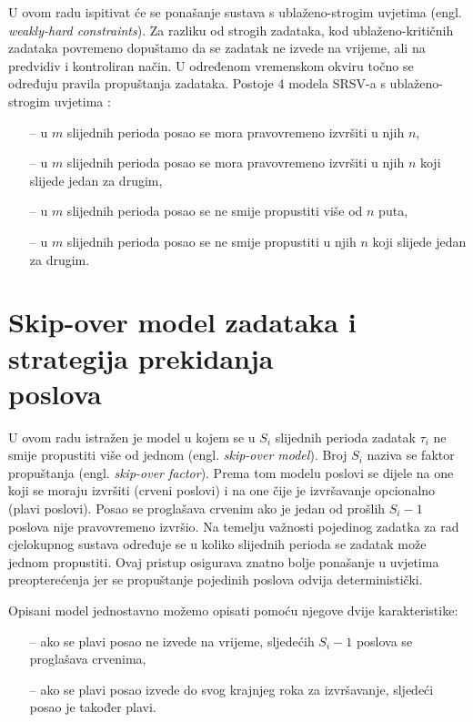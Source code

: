 \documentclass[../zavrsni.tex]{subfiles}
\begin{document}

U ovom radu ispitivat će se ponašanje sustava s ublaženo-strogim uvjetima (engl. \textit{weakly-hard constraints}). Za razliku od 
strogih zadataka, kod ublaženo-kritičnih zadataka povremeno dopuštamo da se zadatak ne izvede na vrijeme, ali na predvidiv i 
kontroliran način. U određenom vremenskom okviru točno se određuju pravila propuštanja zadataka. Postoje 4 modela SRSV-a s ublaženo-strogim uvjetima :
\begin{itemize}
    \item[--] u $m$ slijednih perioda posao se mora pravovremeno izvršiti u njih $n$,
    \item[--] u $m$ slijednih perioda posao se mora pravovremeno izvršiti u njih $n$ koji slijede jedan za drugim,
    \item[--] u $m$ slijednih perioda posao se ne smije propustiti više od $n$ puta,
    \item[--] u $m$ slijednih perioda posao se ne smije propustiti u njih $n$ koji slijede jedan za drugim.
\end{itemize}

\section{Skip-over model zadataka i strategija prekidanja \\poslova}

U ovom radu istražen je model u kojem se u $S_i$ slijednih perioda zadatak $\tau_i$ ne smije propustiti više od jednom (engl. \textit{skip-over model}).
Broj $S_i$ naziva se faktor propuštanja (engl. \textit{skip-over factor}).
Prema tom modelu 
poslovi se dijele na one koji se moraju izvršiti (crveni poslovi) i na one čije je izvršavanje opcionalno (plavi poslovi). Posao se proglašava crvenim 
ako je jedan od prošlih $S_i-1$ poslova nije pravovremeno izvršio.
Na temelju važnosti pojedinog zadatka za rad cjelokupnog sustava određuje se u koliko slijednih perioda 
se zadatak može jednom propustiti. Ovaj pristup osigurava znatno bolje ponašanje u uvjetima preopterećenja jer se propuštanje
pojedinih poslova odvija deterministički.

Opisani model jednostavno možemo opisati pomoću njegove dvije karakteristike:
\begin{itemize}
  \item[--] ako se plavi posao ne izvede na vrijeme, sljedećih $S_i-1$ poslova se proglašava crvenima,
  \item[--] ako se plavi posao izvede do svog krajnjeg roka za izvršavanje, sljedeći posao je također plavi.
\end{itemize}
\end{document}
